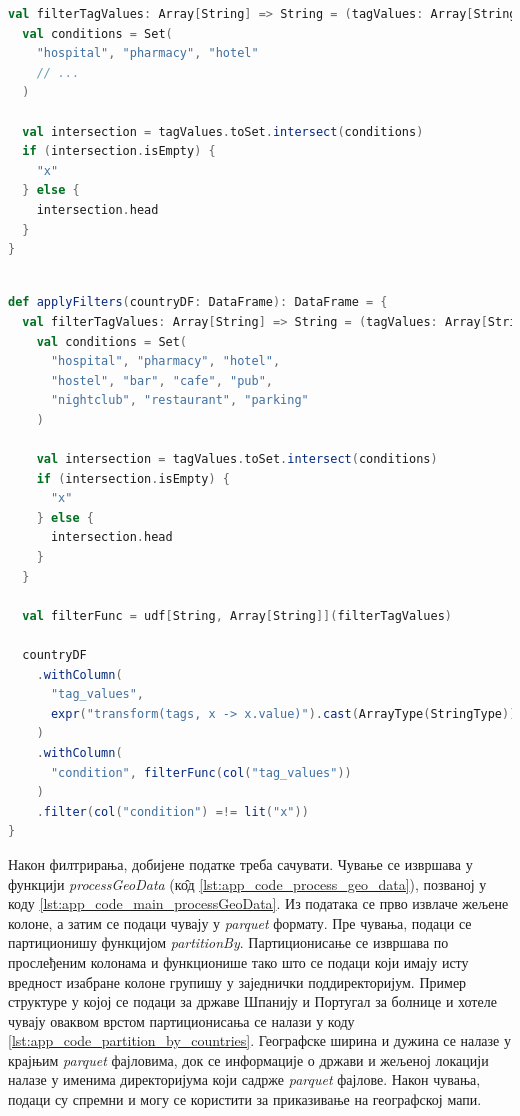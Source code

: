 \documentclass[12pt,oneside]{memoir}
\begin{document}
\begin{lstlisting}[caption={Функција која одређује да ли је локација жељеног типа}, language=Scala, label={lst:app_code_filter_tag_vals_func}]
val filterTagValues: Array[String] => String = (tagValues: Array[String]) => {
  val conditions = Set(
    "hospital", "pharmacy", "hotel"
    // ...
  )

  val intersection = tagValues.toSet.intersect(conditions)
  if (intersection.isEmpty) {
    "x"
  } else {
    intersection.head
  }
}
\end{lstlisting}

\begin{lstlisting}[caption={Функција \textit{applyFilters}}, language=Scala, label={lst:app_code_apply_filters}]

def applyFilters(countryDF: DataFrame): DataFrame = {
  val filterTagValues: Array[String] => String = (tagValues: Array[String]) => {
    val conditions = Set(
      "hospital", "pharmacy", "hotel",
      "hostel", "bar", "cafe", "pub",
      "nightclub", "restaurant", "parking"
    )

    val intersection = tagValues.toSet.intersect(conditions)
    if (intersection.isEmpty) {
      "x"
    } else {
      intersection.head
    }
  }

  val filterFunc = udf[String, Array[String]](filterTagValues)

  countryDF
    .withColumn(
      "tag_values",
      expr("transform(tags, x -> x.value)").cast(ArrayType(StringType))
    )
    .withColumn(
      "condition", filterFunc(col("tag_values"))
    )
    .filter(col("condition") =!= lit("x"))
}
\end{lstlisting}

Након филтрирања, добијене податке треба сачувати. Чување се извршава у функцији \textit{processGeoData} (к\^{о}д \ref{lst:app_code_process_geo_data}), позваној у коду \ref{lst:app_code_main_processGeoData}. Из података се прво извлаче жељене колоне, а затим се подаци чувају у \textit{parquet} формату. Пре чувања, подаци се партиционишу функцијом \textit{partitionBy}.
Партиционисање се извршава по прослеђеним колонама и функционише тако што се подаци који имају исту вредност изабране колоне групишу у заједнички поддиректоријум. Пример структуре у којој се подаци за државе Шпанију и Португал за болнице и хотеле чувају оваквом врстом партиционисања се налази у коду \ref{lst:app_code_partition_by_countries}. Географске ширина и дужина се налазе у крајњим \textit{parquet} фајловима, док се информације о држави и жељеној локацији налазе у именима директоријума који садрже \textit{parquet} фајлове. Након чувања, подаци су спремни и могу се користити за приказивање на географској мапи.
\end{document}
